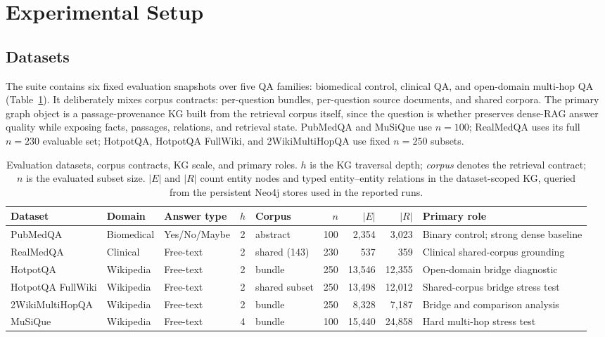 \section{Experimental Setup}
\label{sec:experimental_setup}

\subsection{Datasets}

The suite contains six fixed evaluation snapshots over five QA families:
biomedical control, clinical QA, and open-domain multi-hop QA
(Table~\ref{tab:datasets}).
It deliberately mixes corpus contracts: per-question bundles, per-question
source documents, and shared corpora.
The primary graph object is a passage-provenance KG built from the retrieval
corpus itself, since the question is whether \system{} preserves dense-RAG
answer quality while exposing facts, passages, relations, and retrieval state.
PubMedQA and MuSiQue use $n=100$; RealMedQA uses its full $n=230$ evaluable
set; HotpotQA, HotpotQA FullWiki, and 2WikiMultiHopQA use fixed $n=250$
subsets.

\begin{table}[t]
\centering
\small
\caption{Evaluation datasets, corpus contracts, KG scale, and primary roles.
$h$ is the KG traversal depth; \emph{corpus} denotes the retrieval contract;
$n$ is the evaluated subset size.
$|E|$ and $|R|$ count entity nodes and typed entity--entity relations in the
dataset-scoped KG, queried from the persistent Neo4j stores used in the
reported runs.
\label{tab:datasets}}
\setlength{\tabcolsep}{3pt}
\begin{tabular}{@{}lllclrrrp{2.7cm}@{}}
\toprule
Dataset & Domain & Answer type & $h$ & Corpus & $n$ & $|E|$ & $|R|$ & Primary role \\
\midrule
PubMedQA
  & Biomedical & Yes/No/Maybe & 2 & abstract & 100 & 2{,}354 & 3{,}023 & Binary control; strong dense baseline \\
RealMedQA
  & Clinical & Free-text & 2 & shared (143) & 230 & 537 & 359 & Clinical shared-corpus grounding \\
HotpotQA \citep{yang2018hotpotqa}
  & Wikipedia & Free-text & 2 & bundle & 250 & 13{,}546 & 12{,}355 & Open-domain bridge diagnostic \\
HotpotQA FullWiki \citep{yang2018hotpotqa}
  & Wikipedia & Free-text & 2 & shared subset & 250 & 13{,}498 & 12{,}012 & Shared-corpus bridge stress test \\
2WikiMultiHopQA \citep{ho2020wikimultihopqa}
  & Wikipedia & Free-text & 2 & bundle & 250 & 8{,}328 & 7{,}187 & Bridge and comparison analysis \\
MuSiQue \citep{trivedi2022musique}
  & Wikipedia & Free-text & 4 & bundle & 100 & 15{,}440 & 24{,}858 & Hard multi-hop stress test \\
\bottomrule
\end{tabular}
\end{table}

